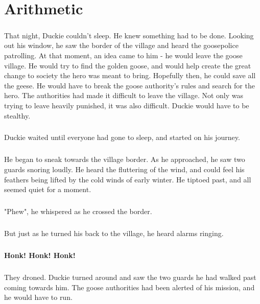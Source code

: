 \chapter{Arithmetic}
\paragraph{} That night, Duckie couldn't sleep. He knew something had to be done. Looking out his window, he saw the border of the village and heard the goosepolice patrolling. At that moment, an idea came to him - he would leave the goose village. He would try to find the golden goose, and would help create the great change to society the hero was meant to bring. Hopefully then, he could save all the geese. He would have to break the goose authority's rules and search for the hero. The authorities had made it difficult to leave the village. Not only was trying to leave heavily punished, it was also difficult. Duckie would have to be stealthy. 
\paragraph{} Duckie waited until everyone had gone to sleep, and started on his journey.
\paragraph{} He began to sneak towards the village border. As he approached, he saw two guards snoring loudly. He heard the fluttering of the wind, and could feel his feathers being lifted by the cold winds of early winter. He tiptoed past, and all seemed quiet for a moment.
\paragraph{} "Phew", he whispered as he crossed the border. 
\paragraph{} But just as he turned his back to the village, he heard alarms ringing. 
\paragraph{} \textbf{Honk! Honk! Honk!}
\paragraph{} They droned. Duckie turned around and saw the two guards he had walked past coming towards him. The goose authorities had been alerted of his mission, and he would have to run. 
